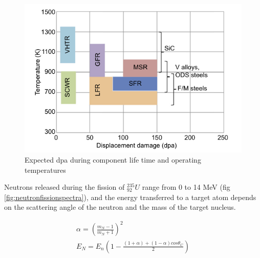 \begin{figure}[h]
  \begin{center}
    \includegraphics[scale=0.55]{chapters/austenitic_steels_in_nuclear/images/dpagenIV.png}
    \caption{Expected \acrshort{dpa} during component life time and operating temperatures\cite{genIVstrucmat}}
    \label{fig:genIVdpa}
  \end{center}
\end{figure}
\FloatBarrier

Neutrons released during the fission of ${}^{235}_{92}U$ range from 0 to 14 MeV (fig \ref{fig:neutronfissionspectra}), and the energy transferred to a target atom depends on the scattering angle of the neutron and the mass of the target nucleus.  

\begin{equation}
\begin{split}
\alpha = (\frac{m_N-1}{m_N+1})^2 \\
E_N = E_n \left(1 - \frac{(1+\alpha) + (1 - \alpha) cos \theta_C}{2}\right)
\end{split}
\label{eq:eqNeutronEnergyTransfer}
\end{equation}

